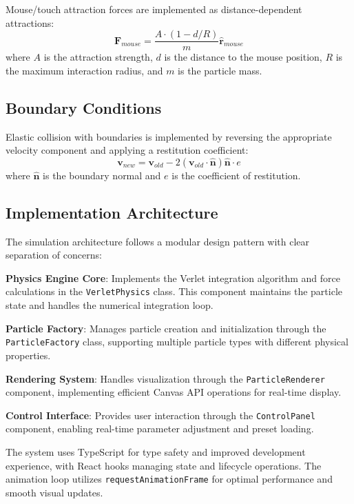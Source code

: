 \documentclass[12pt,journal,onecolumn]{IEEEtran}
\begin{document}
Mouse/touch attraction forces are implemented as distance-dependent attractions:
\begin{equation}
\mathbf{F}_{mouse} = \frac{A \cdot (1 - d/R)}{m} \hat{\mathbf{r}}_{mouse}
\end{equation}
where $A$ is the attraction strength, $d$ is the distance to the mouse position, $R$ is the maximum interaction radius, and $m$ is the particle mass.

\subsection{Boundary Conditions}
Elastic collision with boundaries is implemented by reversing the appropriate velocity component and applying a restitution coefficient:
\begin{equation}
\mathbf{v}_{new} = \mathbf{v}_{old} - 2(\mathbf{v}_{old} \cdot \hat{\mathbf{n}})\hat{\mathbf{n}} \cdot e
\end{equation}
where $\hat{\mathbf{n}}$ is the boundary normal and $e$ is the coefficient of restitution.

\subsection{Implementation Architecture}
The simulation architecture follows a modular design pattern with clear separation of concerns:

\textbf{Physics Engine Core}: Implements the Verlet integration algorithm and force calculations in the \texttt{VerletPhysics} class. This component maintains the particle state and handles the numerical integration loop.

\textbf{Particle Factory}: Manages particle creation and initialization through the \texttt{ParticleFactory} class, supporting multiple particle types with different physical properties.

\textbf{Rendering System}: Handles visualization through the \texttt{ParticleRenderer} component, implementing efficient Canvas API operations for real-time display.

\textbf{Control Interface}: Provides user interaction through the \texttt{ControlPanel} component, enabling real-time parameter adjustment and preset loading.

The system uses TypeScript for type safety and improved development experience, with React hooks managing state and lifecycle operations. The animation loop utilizes \texttt{requestAnimationFrame} for optimal performance and smooth visual updates.
\end{document}
